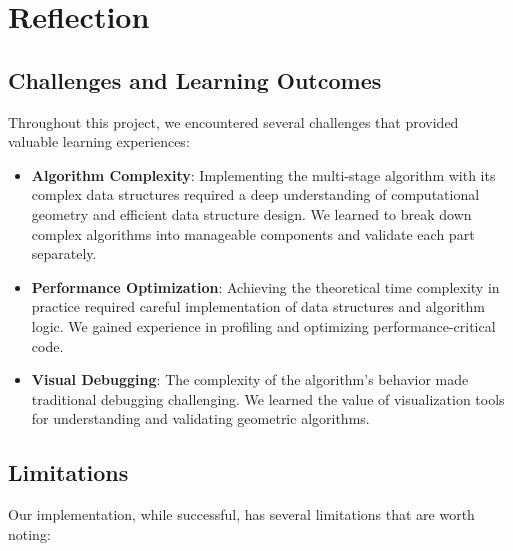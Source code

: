 \documentclass[11pt]{article}
\begin{document}
\section{Reflection}

\subsection{Challenges and Learning Outcomes}

Throughout this project, we encountered several challenges that provided valuable learning experiences:

\begin{itemize}
    \item \textbf{Algorithm Complexity}: Implementing the multi-stage algorithm with its complex data structures required a deep understanding of computational geometry and efficient data structure design. We learned to break down complex algorithms into manageable components and validate each part separately.
    
    \item \textbf{Performance Optimization}: Achieving the theoretical time complexity in practice required careful implementation of data structures and algorithm logic. We gained experience in profiling and optimizing performance-critical code.
    
    \item \textbf{Visual Debugging}: The complexity of the algorithm's behavior made traditional debugging challenging. We learned the value of visualization tools for understanding and validating geometric algorithms.
\end{itemize}

\subsection{Limitations}

Our implementation, while successful, has several limitations that are worth noting:
\end{document}
